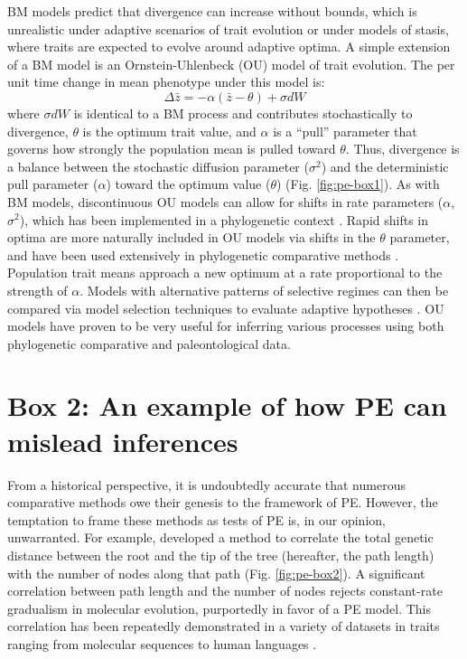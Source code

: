 	BM models predict that divergence can increase without bounds, which is unrealistic under adaptive scenarios of trait evolution or under models of stasis, where traits are expected to evolve around adaptive optima. A simple extension of a BM model is an Ornstein-Uhlenbeck (OU) model of trait evolution. The per unit time change in mean phenotype under this model is:
\begin{equation}
\Delta \bar{z} = -\alpha(\bar{z}-\theta)+\sigma dW
\end{equation}
where $\sigma dW$ is identical to a BM process and contributes stochastically to divergence,  $\theta$ is the optimum trait value, and $\alpha$ is a ``pull'' parameter that governs how strongly the population mean is pulled toward $\theta$. Thus, divergence is a balance between the stochastic diffusion parameter ($\sigma^2$) and the deterministic pull parameter ($\alpha$) toward the optimum value ($\theta$) (Fig. \ref{fig:pe-box1}). As with BM models, discontinuous OU models can allow for shifts in rate parameters ($\alpha$, $\sigma^2$), which has been implemented in a phylogenetic context \citep{Beaulieu2012}. Rapid shifts in optima are more naturally included in OU models via shifts in the $\theta$ parameter, and have been used extensively in phylogenetic comparative methods \citep{Hansen1997, ButlerKing2004, Beaulieu2012}. Population trait means approach a new optimum at a rate proportional to the strength of $\alpha$. Models with alternative patterns of selective regimes can then be compared via model selection techniques to evaluate adaptive hypotheses \citep{ButlerKing2004}. OU models have proven to be very useful for inferring various processes using both phylogenetic comparative \citep{Hansen2008, Mahler2013Science} and paleontological \citep{Hunt2008, Reitan2012} data.


\section{Box 2: An example of how PE can mislead inferences}
From a historical perspective, it is undoubtedly accurate that numerous comparative methods owe their genesis to the framework of PE. However, the temptation to frame these methods as tests of PE is, in our opinion, unwarranted. For example, \citet{Webster2003} developed a method to correlate the total genetic distance between the root and the tip of the tree (hereafter, the path length) with the number of nodes along that path (Fig. \ref{fig:pe-box2}). A significant correlation between path length and the number of nodes rejects constant-rate gradualism in molecular evolution, purportedly in favor of a PE model. This correlation has been repeatedly demonstrated in a variety of datasets in traits ranging from molecular sequences to human languages \citep{Webster2003, Pagel2006, Atkinson2008, Lanfear2010} \citep[but see][]{Goldie2011}.

